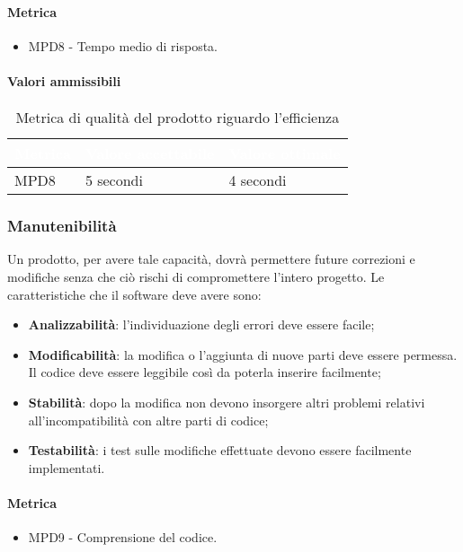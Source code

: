 \paragraph{Metrica}
\begin{itemize}
\item MPD8 - Tempo medio di risposta.
\end{itemize}
\paragraph{Valori ammissibili}
\renewcommand{\arraystretch}{1.5}
\begin{longtable}{C{2.5cm} C{4cm} C{4cm}}
\textcolor{white}{\textbf{Metrica}}&
\textcolor{white}{\textbf{Valore accettabile}}&
\textcolor{white}{\textbf{Valore ottimale}}\\	
\endhead
\endfoot
{}\caption{Metrica di qualità del prodotto riguardo l'efficienza}
\endlastfoot
		MPD8 &  
		5 secondi &
		4 secondi \\
\end{longtable}
\subsubsection{Manutenibilità}
Un prodotto, per avere tale capacità, dovrà permettere future correzioni e modifiche senza che ciò rischi di compromettere l'intero progetto. Le caratteristiche che il software deve avere sono:
\begin{itemize}
\item \textbf{Analizzabilità}: l'individuazione degli errori deve essere facile;
\item \textbf{Modificabilità}: la modifica o l'aggiunta di nuove parti deve essere permessa. Il codice deve essere leggibile così da poterla inserire facilmente;
\item \textbf{Stabilità}: dopo la modifica non devono insorgere altri problemi relativi all'incompatibilità con altre parti di codice;
\item \textbf{Testabilità}: i test sulle modifiche effettuate devono essere facilmente implementati.
\end{itemize}
\paragraph{Metrica}
\begin{itemize}
\item MPD9 - Comprensione del codice.
\end{itemize}
